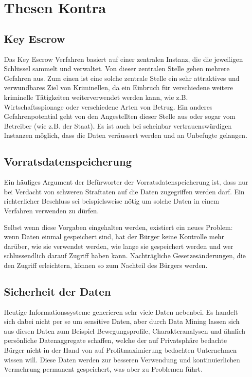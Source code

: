 %
%

\section*{Thesen Kontra}

\subsection{Key Escrow}
Das Key Escrow Verfahren basiert auf einer zentralen Instanz,
die die jeweiligen Schlüssel sammelt und verwaltet.
Von dieser zentralen Stelle gehen mehrere Gefahren aus. Zum einen ist eine
solche zentrale Stelle ein sehr attraktives und verwundbares Ziel von Kriminellen, 
da ein Einbruch für verschiedene weitere
kriminelle Tätigkeiten weiterverwendet werden kann, wie z.B.
Wirtschaftsspionage oder verschiedene Arten von Betrug.
Ein anderes Gefahrenpotential geht von den Angestellten dieser Stelle aus oder
sogar vom Betreiber (wie z.B. der Staat).
Es ist auch bei scheinbar vertrauenswürdigen Instanzen möglich,
dass die Daten veräussert werden und an Unbefugte gelangen.

\subsection{Vorratsdatenspeicherung}
Ein häufiges Argument der Befürworter der Vorratsdatenspeicherung ist,
dass nur bei Verdacht von schweren Straftaten auf die Daten zugegriffen werden darf.
Ein richterlicher Beschluss sei beispielsweise nötig um solche Daten
in einem Verfahren verwenden zu dürfen.

Selbst wenn diese Vorgaben eingehalten werden, existiert ein
neues Problem: wenn Daten einmal gespeichert sind, hat der 
Bürger keine Kontrolle mehr darüber, wie sie verwendet werden,
wie lange sie gespeichert werden und wer schlussendlich darauf
Zugriff haben kann. Nachträgliche Gesetzesänderungen, die den Zugriff erleichtern, können so zum Nachteil
des Bürgers werden.

\subsection{Sicherheit der Daten}
Heutige Informationssysteme generieren sehr viele Daten nebenbei. Es
handelt sich dabei nicht per se um sensitive Daten, aber durch Data
Mining lassen sich aus diesen Daten zum Beispiel Bewegungsprofile,
Charakteranalysen und ähnlich persönliche Datenaggregate schaffen,
welche der auf Privatsphäre bedachte Bürger nicht in der Hand von auf
Profitmaximierung bedachten Unternehmen wissen will.
Diese Daten werden zur besseren Verwendung und kontinuierlichen
Vermehrung permanent gespeichert, was aber zu Problemen führt. 

